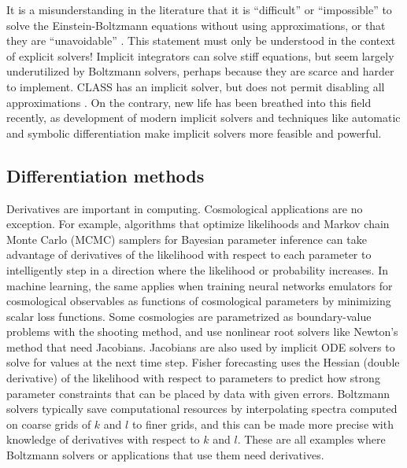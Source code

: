 \documentclass{aa}
\begin{document}
It is a misunderstanding in the literature that it is \enquote{difficult} or \enquote{impossible} to solve the Einstein-Boltzmann equations without using approximations, or that they are \enquote{unavoidable} \citep[][respectively]{maCosmologicalPerturbationTheory1995,lewisCAMBNotes2025,lesgourguesCosmicLinearAnisotropy2011}.
This statement must only be understood in the context of explicit solvers!
Implicit integrators can solve stiff equations, but seem largely underutilized by Boltzmann solvers, perhaps because they are scarce and harder to implement.
CLASS has an implicit solver, but does not permit disabling all approximations \cite{blasCosmicLinearAnisotropy2011a}.
On the contrary, new life has been breathed into this field recently, as development of modern implicit solvers and techniques like automatic and symbolic differentiation make implicit solvers more feasible and powerful.

\subsection{Differentiation methods}
\label{sec:intro_diff}


Derivatives are important in computing.
Cosmological applications are no exception.
For example, algorithms that optimize likelihoods and Markov chain Monte Carlo (MCMC) samplers for Bayesian parameter inference can take advantage of derivatives of the likelihood with respect to each parameter to intelligently step in a direction where the likelihood or probability increases.
In machine learning, the same applies when training neural networks emulators for cosmological observables as functions of cosmological parameters by minimizing scalar loss functions.
Some cosmologies are parametrized as boundary-value problems with the shooting method, and use nonlinear root solvers like Newton's method that need Jacobians.
Jacobians are also used by implicit ODE solvers to solve for values at the next time step.
Fisher forecasting uses the Hessian (double derivative) of the likelihood with respect to parameters to predict how strong parameter constraints that can be placed by data with given errors.
Boltzmann solvers typically save computational resources by interpolating spectra computed on coarse grids of $k$ and $l$ to finer grids, and this can be made more precise with knowledge of derivatives with respect to $k$ and $l$.
These are all examples where Boltzmann solvers or applications that use them need derivatives.
\end{document}
